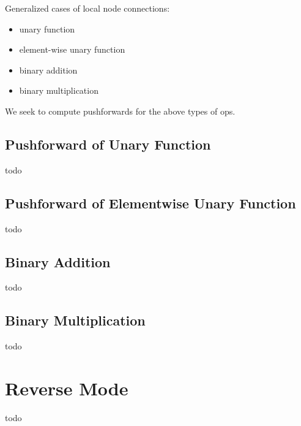 \documentclass[8pt,letter]{article}
\begin{document}
\begin{multicols*}{2}
  Generalized cases of local node connections:
  \begin{itemize}
  \item unary function
  \item element-wise unary function
  \item binary addition
  \item binary multiplication
  \end{itemize}

  We seek to compute pushforwards for the above types of ops.

  \subsection{Pushforward of Unary Function}
  todo

  \subsection{Pushforward of Elementwise Unary Function}
  todo

  \subsection{Binary Addition}
  todo

  \subsection{Binary Multiplication}
  todo

  \vfill\null
  \columnbreak
    
  \section{Reverse Mode}
  todo
  
\end{multicols*}
\end{document}
